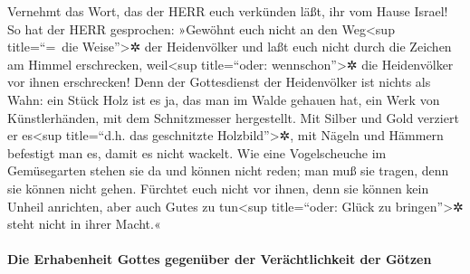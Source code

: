 Vernehmt das Wort, das der HERR euch verkünden läßt, ihr
vom Hause Israel! So hat der HERR gesprochen: »Gewöhnt
euch nicht an den Weg\textless sup title=``=~die Weise''\textgreater✲
der Heidenvölker und laßt euch nicht durch die Zeichen am Himmel
erschrecken, weil\textless sup title=``oder: wennschon''\textgreater✲
die Heidenvölker vor ihnen erschrecken! Denn der
Gottesdienst der Heidenvölker ist nichts als Wahn: ein Stück Holz ist es
ja, das man im Walde gehauen hat, ein Werk von Künstlerhänden, mit dem
Schnitzmesser hergestellt. Mit Silber und Gold verziert er
es\textless sup title=``d.h. das geschnitzte Holzbild''\textgreater✲,
mit Nägeln und Hämmern befestigt man es, damit es nicht wackelt.
Wie eine Vogelscheuche im Gemüsegarten stehen sie da und
können nicht reden; man muß sie tragen, denn sie können nicht gehen.
Fürchtet euch nicht vor ihnen, denn sie können kein Unheil anrichten,
aber auch Gutes zu tun\textless sup title=``oder: Glück zu
bringen''\textgreater✲ steht nicht in ihrer Macht.«

\hypertarget{die-erhabenheit-gottes-gegenuxfcber-der-veruxe4chtlichkeit-der-guxf6tzen}{%
\paragraph{Die Erhabenheit Gottes gegenüber der Verächtlichkeit der
Götzen}\label{die-erhabenheit-gottes-gegenuxfcber-der-veruxe4chtlichkeit-der-guxf6tzen}}

